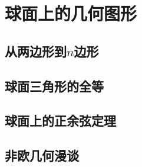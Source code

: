 \section{球面上的几何图形}
\subsection{从两边形到\texorpdfstring{\(n\)}s边形}
\clearpage
\subsection{球面三角形的全等}
\clearpage
\subsection{球面上的正余弦定理}
\clearpage






\subsection{非欧几何漫谈}
\clearpage